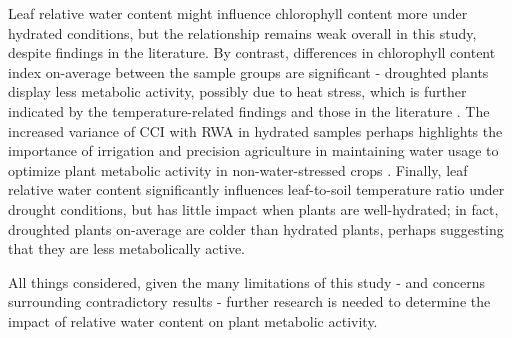 \documentclass{report}
\begin{document}
\hspace{24pt} Leaf relative water content might influence chlorophyll content more under hydrated conditions, but the relationship remains weak overall in this study, despite findings in the literature. By contrast, differences in chlorophyll content index on-average between the sample groups are significant - droughted plants display less metabolic activity, possibly due to heat stress, which is further indicated by the temperature-related findings and those in the literature \parencite{heat}. The increased variance of CCI with RWA in hydrated samples perhaps highlights the importance of irrigation and precision agriculture in maintaining water usage to optimize plant metabolic activity in non-water-stressed crops \parencite{irrigation}. Finally, leaf relative water content significantly influences leaf-to-soil temperature ratio under drought conditions, but has little impact when plants are well-hydrated; in fact, droughted plants on-average are colder than hydrated plants, perhaps suggesting that they are less metabolically active.

\hspace{24pt}All things considered, given the many limitations of this study - and concerns surrounding contradictory results - further research is needed to determine the impact of relative water content on plant metabolic activity.

\clearpage

\printbibliography
\end{document}
